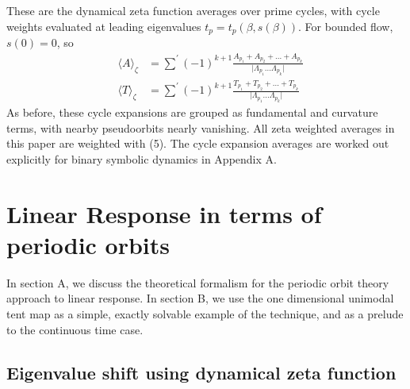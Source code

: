 \documentclass[twocolumn,aip,cha]{revtex4-1}
\begin{document}
These are the dynamical zeta function averages over prime cycles, with cycle weights evaluated at leading eigenvalues $t_{p} = t_{p}(\beta,s(\beta))$. For bounded flow, $s(0)=0$, so
\begin{eqnarray*}
&\langle A \rangle_{\zeta}& = \sum^{'}(-1)^{k+1}\frac{A_{p_{1}}+A_{p_{2}}+...+A_{p_{k}}}{\vert \Lambda_{p_{1}}...\Lambda_{p_{k}}\vert}\\
&\langle T \rangle_{\zeta}& = \sum^{'}(-1)^{k+1}\frac{T_{p_{1}}+T_{p_{2}}+...+T_{p_{k}}}{\vert \Lambda_{p_{1}}...\Lambda_{p_{k}}\vert}
\end{eqnarray*}
As before, these cycle expansions are grouped as fundamental and curvature terms, with nearby pseudoorbits nearly vanishing. All zeta weighted averages in this paper are weighted with (5). The cycle expansion averages are worked out explicitly for binary symbolic dynamics in Appendix A.

\section{Linear Response in terms of periodic orbits}

In section A, we discuss the theoretical formalism for the periodic orbit theory approach to linear response. In section B, we use the one dimensional unimodal tent map as a simple, exactly solvable example of the technique, and as a prelude to the continuous time case.

\subsection{Eigenvalue shift using dynamical zeta function}
\end{document}
